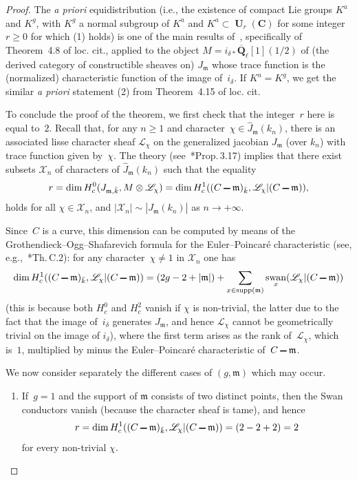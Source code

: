 \documentclass[12pt]{amsart}
\renewcommand{\geq}{\geqslant}
\numberwithin{equation}{section}
\def\setminus{\mathchoice
    {\mathbin{\vrule height .62ex width 1.61ex depth -.38ex}}%
    {\mathbin{\vrule height .62ex width 1.61ex depth -.38ex}}%
    {\mathbin{\vrule height .50ex width 0.85ex depth -.28ex}}%
    {\mathbin{\vrule height .20ex width 0.570ex depth -.24ex}}%
}
\newcommand{\Cc}{\mathbf{C}}
\newcommand{\Qq}{\mathbf{Q}}
\newcommand{\bQl}{\overline{\Qq}_{\ell}}
\def\loccit{loc.\kern3pt cit.{}\xspace}
\newcommand{\mfm}{\mathfrak{m}}
\DeclareMathOperator{\swan}{swan}
\DeclareMathOperator{\Un}{\mathbf{U}}
\theoremstyle{plain}
\theoremstyle{remark}
\theoremstyle{definition}
\newcommand{\mcL}{\mathscr{L}}
\newcommand{\mcX}{\mathscr{X}}
\renewcommand{\geq}{\geqslant}
\begin{document}
\begin{proof}
  The \emph{a priori} equidistribution (i.e., the existence of compact
  Lie groups $K^a$ and $K^g$, with $K^g$ a normal subgroup of $K^a$ and
  $K^a\subset \Un_r(\Cc)$ for some integer~$r\geq 0$ for which (1)
  holds) is one of the main results of~\cite{ffk}, specifically of
  Theorem~4.8 of \loccit, applied to the object
  $M=i_{\delta*}\bQl[1](1/2)$ of (the derived category of constructible
  sheaves on) $J_{\mfm}$ whose trace function is the (normalized)
  characteristic function of the image of~$i_{\delta}$. If $K^a=K^g$, we
  get the similar \emph{a priori} statement (2) from Theorem~4.15 of \loccit 

  To conclude the proof of the theorem, we first check that the
  integer~$r$ here is equal to~$2$. Recall that, for any
  $n\geq 1$ and character~$\chi\in \widehat{J}_{\mfm}(k_n)$, there is an
  associated lisse character sheaf $\mcL_{\chi}$ on the generalized
  jacobian $J_{\mfm}$ (over $k_n$) with trace function given
  by~$\chi$. The theory (see~\cite{ffk}*{Prop.\,3.17}) implies that
  there exist subsets $\mcX_n$ of characters of
  $\widehat{J}_{\mfm}(k_n)$ such that the equality
  \[
    r=\dim H^0_c(J_{\mfm,\bar{k}},M\otimes\mcL_{\chi})=
    \dim H^1_c((C\setminus \mfm)_{\bar{k}},\mcL_{\chi}|(C\setminus\mfm)),
  \]
  holds for all $\chi\in\mcX_n$, and $|\mcX_n|\sim |J_{\mfm}(k_n)|$ as $n\to
  +\infty$. 
 
  Since~$C$ is a curve, this dimension can be computed by means of the Grothendieck--Ogg--Shafarevich formula for the Euler--Poincaré characteristic (see, e.g.,~\cite{ffk}*{Th.\,C.2}): for any
  character~$\chi\not=1$ in $\mcX_n$ one has
  \[
    \dim H^1_c((C\setminus
    \mfm)_{\bar{k}},\mcL_{\chi}|(C\setminus\mfm))=(2g-2+|\mfm|)+\sum_{x\in \mathrm{supp}(\mfm)}\swan_x(\mcL_{\chi}|(C\setminus\mfm) )
  \]
  (this is because both $H^0_c$ and $H^2_c$ vanish if $\chi$ is
  non-trivial, the latter due to the fact that the image of~$i_{\delta}$
  generates $J_{\mfm}$, and hence $\mcL_{\chi}$ cannot be geometrically trivial on the
  image of $i_{\delta}$), where the first term arises as the rank
  of~$\mcL_{\chi}$, which is~$1$, multiplied by minus the
  Euler--Poincaré characteristic of~$C\setminus\mfm$.
  
  We now consider separately the different cases of $(g,\mfm)$ which may
  occur.
  
  \begin{enumerate}
  \item If~$g=1$ and the support of $\mfm$ consists of two distinct
    points, then the Swan conductors vanish (because the character sheaf
    is tame), and hence
    \[
      r=\dim H^1_c((C\setminus
      \mfm)_{\bar{k}},\mcL_{\chi}|(C\setminus\mfm))=(2-2+2)=2
    \]
    for every non-trivial $\chi$. 
        

\end{enumerate}
\end{proof}
\end{document}
